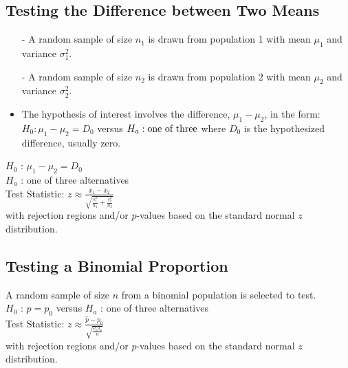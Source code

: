 \documentclass[12pt, letterpaper]{article}
\begin{document}
        \subsection{Testing the Difference between Two Means}
            \begin{itemize}
                \item[-] A random sample of size $n_1$ is drawn from population 1 with mean $\mu_1$ and variance $\sigma_1^2$.
                \item[-] A random sample of size $n_2$ is drawn from population 2 with mean $\mu_2$ and variance $\sigma_2^2$.
                \item The hypothesis of interest involves the difference, $\mu_1 - \mu_2$, in the form: $H_0 : \mu_1 - \mu_2 = D_0$ versus $H_a : \textnormal{one of three}$ where $D_0$ is the hypothesized difference, usually zero.
            \end{itemize}
            \begin{mdframed}[leftmargin=0.5cm, rightmargin=0.5cm]
                \begin{flushleft}
                        $H_0$ : $\mu_1 - \mu_2 = D_0$ \\
                        $H_a$ : one of three alternatives \\ 
                        Test Statistic: $z \approx \frac{\bar{x}_1 - \bar{x}_2}{\sqrt{\frac{s_1^2}{n_1} + \frac{s_2^2}{n_2}}}$ \\
                        with rejection regions and/or $p$-values based on the standard normal $z$ distribution.
                \end{flushleft}
            \end{mdframed}
        \subsection{Testing a Binomial Proportion}
            \begin{mdframed}[leftmargin=0.5cm, rightmargin=0.5cm]
                \begin{flushleft}
                    A random sample of size $n$ from a binomial population is selected to test. \\
                    $H_0$ : $p = p_0$ versus $H_a$ : one of three alternatives \\
                    Test Statistic: $z \approx {\frac{\hat{p}-p_0}{\sqrt{\frac{p_0q_0}{n}}}}$ \\
                    with rejection regions and/or $p$-values based on the standard normal $z$ distribution.
                \end{flushleft}
            \end{mdframed}
\end{document}
